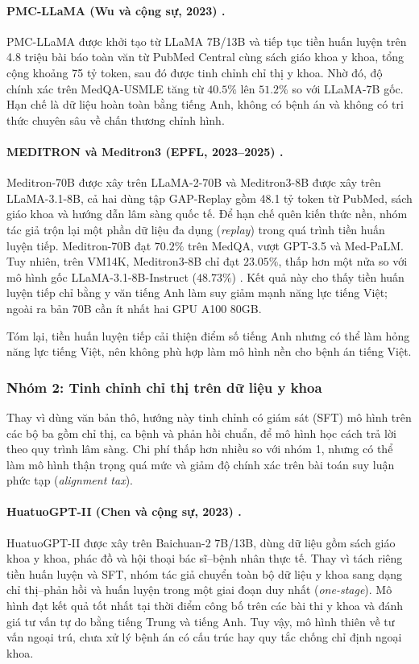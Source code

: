 \paragraph{PMC-LLaMA (Wu và cộng sự, 2023) \cite{wu2023pmc}.}
PMC-LLaMA được khởi tạo từ LLaMA 7B/13B và tiếp tục tiền huấn luyện trên 4.8 triệu bài báo toàn văn từ PubMed Central cùng sách giáo khoa y khoa, tổng cộng khoảng 75 tỷ token, sau đó được tinh chỉnh chỉ thị y khoa. Nhờ đó, độ chính xác trên MedQA-USMLE tăng từ $40.5\%$ lên $51.2\%$ so với LLaMA-7B gốc. Hạn chế là dữ liệu hoàn toàn bằng tiếng Anh, không có bệnh án và không có tri thức chuyên sâu về chấn thương chỉnh hình.

\paragraph{MEDITRON và Meditron3 (EPFL, 2023--2025) \cite{chen2023meditron}.}
Meditron-70B được xây trên LLaMA-2-70B và Meditron3-8B được xây trên LLaMA-3.1-8B, cả hai dùng tập GAP-Replay gồm 48.1 tỷ token từ PubMed, sách giáo khoa và hướng dẫn lâm sàng quốc tế. Để hạn chế quên kiến thức nền, nhóm tác giả trộn lại một phần dữ liệu đa dụng (\emph{replay}) trong quá trình tiền huấn luyện tiếp. Meditron-70B đạt $70.2\%$ trên MedQA, vượt GPT-3.5 và Med-PaLM. Tuy nhiên, trên VM14K, Meditron3-8B chỉ đạt $23.05\%$, thấp hơn một nửa so với mô hình gốc LLaMA-3.1-8B-Instruct ($48.73\%$) \cite{vm14k_2025}. Kết quả này cho thấy tiền huấn luyện tiếp chỉ bằng y văn tiếng Anh làm suy giảm mạnh năng lực tiếng Việt; ngoài ra bản 70B cần ít nhất hai GPU A100 80GB.

Tóm lại, tiền huấn luyện tiếp cải thiện điểm số tiếng Anh nhưng có thể làm hỏng năng lực tiếng Việt, nên không phù hợp làm mô hình nền cho bệnh án tiếng Việt.

\subsubsection{Nhóm 2: Tinh chỉnh chỉ thị trên dữ liệu y khoa}
Thay vì dùng văn bản thô, hướng này tinh chỉnh có giám sát (SFT) mô hình trên các bộ ba gồm chỉ thị, ca bệnh và phản hồi chuẩn, để mô hình học cách trả lời theo quy trình lâm sàng. Chi phí thấp hơn nhiều so với nhóm 1, nhưng có thể làm mô hình thận trọng quá mức và giảm độ chính xác trên bài toán suy luận phức tạp (\emph{alignment tax}).

\paragraph{HuatuoGPT-II (Chen và cộng sự, 2023) \cite{chen2023huatuogpt}.}
HuatuoGPT-II được xây trên Baichuan-2 7B/13B, dùng dữ liệu gồm sách giáo khoa y khoa, phác đồ và hội thoại bác sĩ--bệnh nhân thực tế. Thay vì tách riêng tiền huấn luyện và SFT, nhóm tác giả chuyển toàn bộ dữ liệu y khoa sang dạng chỉ thị--phản hồi và huấn luyện trong một giai đoạn duy nhất (\emph{one-stage}). Mô hình đạt kết quả tốt nhất tại thời điểm công bố trên các bài thi y khoa và đánh giá tư vấn tự do bằng tiếng Trung và tiếng Anh. Tuy vậy, mô hình thiên về tư vấn ngoại trú, chưa xử lý bệnh án có cấu trúc hay quy tắc chống chỉ định ngoại khoa.

